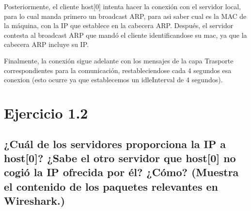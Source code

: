 Posteriormente, el cliente host[0] intenta hacer la conexión con el servidor local, para lo cual manda primero un broadcast ARP, para asi saber 
cual es la MAC de la máquina, con la IP que establece en la cabecera ARP. Después, el servidor contesta al broadcast ARP que mandó el cliente identificandose su mac, ya que la cabecera ARP incluye su IP.

Finalmente, la conexión sigue adelante con los mensajes de la capa Trasporte correspondientes para la comunicación, restableciendose cada 4 segundos esa conexion (esto ocurre ya que establecemos un idleInterval de 4 segundos).




\section{Ejercicio 1.2}

\subsection{¿Cuál de los servidores proporciona la IP a host[0]? ¿Sabe el otro servidor que host[0] no cogió la IP ofrecida
por él? ¿Cómo? (Muestra el contenido de los paquetes relevantes en Wireshark.)}